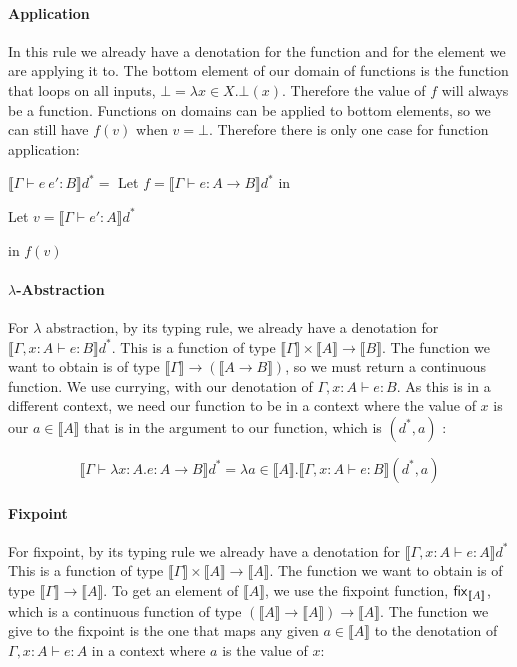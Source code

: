 \paragraph{Application} In this rule we already have a denotation for the function and for the element we are applying it to. The bottom element of our domain of functions is the function that loops on all inputs, $\bot = \lambda x \in X. \bot(x)$. Therefore the value of $f$ will always be a function. Functions on domains can be applied to bottom elements, so we can still have $f(v)$ when $v = \bot$. Therefore there is only one case for function application: 

\vspace{0.25cm}

$\llbracket \Gamma \vdash e \ e' : B \rrbracket d^* =$ Let $f = \llbracket \Gamma \vdash e : A \to B \rrbracket d^*$ in 

\hspace{4.5cm} Let $v = \llbracket \Gamma \vdash e' : A \rrbracket d^*$ 

\hspace{7cm} in $f(v)$

\paragraph{$\lambda$-Abstraction} For $\lambda$ abstraction, by its typing rule, we already have a denotation for $\llbracket \Gamma , x : A \vdash e : B \rrbracket d^*$. This is a function of type $\llbracket \Gamma \rrbracket \times \llbracket A \rrbracket \to \llbracket B \rrbracket$. The function we want to obtain is of type $\llbracket \Gamma \rrbracket \to  (\llbracket A \to  B \rrbracket)$, so we must return a continuous function. We use currying, with our denotation of $\Gamma, x : A \vdash e : B$. As this is in a different context, we need our function to be in a context where the value of $x$ is our $a \in \llbracket A \rrbracket$ that is in the argument to our function, which is $(d^*, a)$ :

\[\llbracket \Gamma \vdash \lambda x : A. e : A \to B \rrbracket d^* = \lambda a \in \llbracket A \rrbracket . \llbracket \Gamma, x : A \vdash e : B \rrbracket(d^*, a)\]
 
\paragraph{Fixpoint} For fixpoint, by its typing rule we already have a denotation for $\llbracket \Gamma , x : A \vdash e : A \rrbracket d^*$ This is a function of type $\llbracket \Gamma \rrbracket \times \llbracket A \rrbracket \to \llbracket A \rrbracket$. The function we want to obtain is of type $\llbracket \Gamma \rrbracket \to  \llbracket A \rrbracket$. To get an element of $\llbracket A \rrbracket$, we use the fixpoint function, $\operatorname{\mathsf{fix}}_{\llbracket A \rrbracket}$, which is a continuous function of type $(\llbracket A \rrbracket \to \llbracket A \rrbracket) \to \llbracket A \rrbracket$. The function we give to the fixpoint is the one that maps any given $a \in \llbracket A \rrbracket$ to the denotation of $ \Gamma , x : A \vdash e : A$ in a context where $a$ is the value of $x$:

